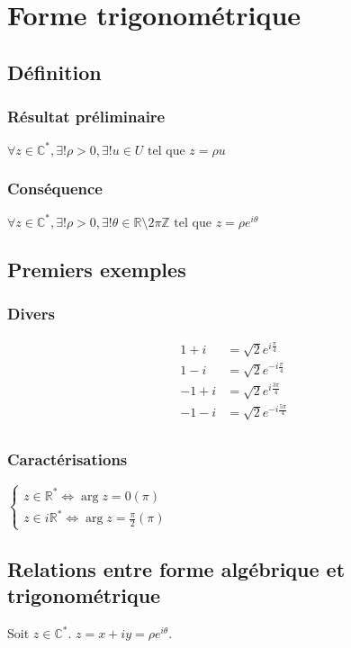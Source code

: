 \documentclass[12pt,a4paper,french]{book}
\begin{document}
	\section{Forme trigonométrique}
		\subsection{Définition}
			\subsubsection{Résultat préliminaire}
			$\forall z \in \mathbb{C}^\ast, \exists! \rho > 0, \exists! u \in U \mbox{ tel que } z = \rho u$
			\subsubsection{Conséquence}
			$\forall z \in \mathbb{C}^\ast, \exists! \rho >0, \exists! \theta \in \mathbb{R} \setminus 2\pi \mathbb{Z} \mbox{ tel que } z = \rho e^{i\theta}$
		\subsection{Premiers exemples}
			\subsubsection{Divers}
			\begin{equation*}
				\begin{split}
					1+i &= \sqrt{2}e^{i\frac{\pi}{4}} \\
					1-i &= \sqrt{2}e^{-i\frac{\pi}{4}} \\
					-1+i &= \sqrt{2}e^{i\frac{3\pi}{4}} \\
					-1-i &= \sqrt{2}e^{-i\frac{5\pi}{4}} \\
				\end{split}
			\end{equation*}
			\subsubsection{Caractérisations}
			$\left\{\begin{array}{ll}
				z \in \mathbb{R}^\ast \Leftrightarrow \arg{z} = 0 (\pi)\\
				z \in i\mathbb{R}^\ast \Leftrightarrow \arg{z} = \frac{\pi}{2} (\pi)
			\end{array}\right.$
		\subsection{Relations entre forme algébrique et trigonométrique}
		Soit $z \in \mathbb{C}^\ast$. $z = x + iy = \rho e^{i\theta}$.
		
\end{document}
